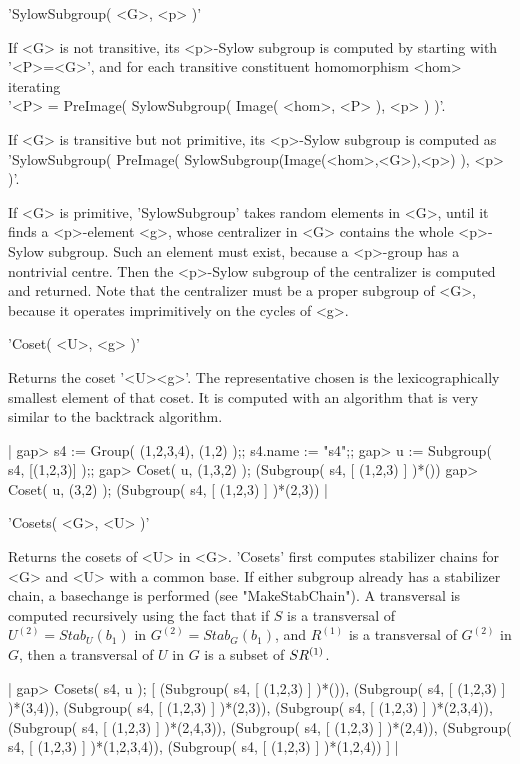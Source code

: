\vspace{5mm}
'SylowSubgroup( <G>, <p> )'%

If <G> is not transitive, its <p>-Sylow subgroup is computed by starting
with '<P>\:=<G>', and for each transitive constituent homomorphism <hom>
iterating \\
'<P> \:= PreImage( SylowSubgroup( Image( <hom>, <P> ), <p> ) )'.

If <G>  is  transitive but  not  primitive,  its  <p>-Sylow  subgroup  is
computed as \\
'SylowSubgroup( PreImage( SylowSubgroup(Image(<hom>,<G>),<p>) ), <p> )'.

If <G> is primitive,  'SylowSubgroup' takes random elements in <G>, until
it finds a <p>-element <g>, whose centralizer in <G>  contains  the whole
<p>-Sylow subgroup.   Such an element must exist, because a <p>-group has
a nontrivial  centre.  Then the  <p>-Sylow subgroup of the centralizer is
computed and  returned.   Note that  the  centralizer  must  be  a proper
subgroup of <G>, because it operates imprimitively on the cycles of <g>.

\vspace{5mm}
'Coset( <U>, <g> )'%

Returns   the  coset  '<U>\*<g>'.   The  representative  chosen   is  the
lexicographically smallest element of that coset.  It is computed with an
algorithm that is very similar to the backtrack algorithm.

|    gap> s4 := Group( (1,2,3,4), (1,2) );;  s4.name := "s4";;
    gap> u := Subgroup( s4, [(1,2,3)] );;
    gap> Coset( u, (1,3,2) );
    (Subgroup( s4, [ (1,2,3) ] )*())
    gap> Coset( u, (3,2) );
    (Subgroup( s4, [ (1,2,3) ] )*(2,3)) |

\vspace{5mm}
'Cosets( <G>, <U> )'%

Returns the  cosets  of <U> in  <G>.   'Cosets' first computes stabilizer
chains for <G> and <U> with  a common  base.  If either subgroup  already
has a stabilizer  chain, a basechange is performed (see "MakeStabChain").
A  transversal is  computed recursively using the fact that  if  $S$ is a
transversal of $U^{(2)} =  Stab_U(b_1)$ in  $G^{(2)}  = Stab_G(b_1)$, and
$R^{(1)}$ is a transversal of $G^{(2)}$ in $G$, then a transversal of $U$
in $G$ is a subset of $S \* R^{(1)}$.

|    gap> Cosets( s4, u );
    [ (Subgroup( s4, [ (1,2,3) ] )*()),
      (Subgroup( s4, [ (1,2,3) ] )*(3,4)),
      (Subgroup( s4, [ (1,2,3) ] )*(2,3)),
      (Subgroup( s4, [ (1,2,3) ] )*(2,3,4)),
      (Subgroup( s4, [ (1,2,3) ] )*(2,4,3)),
      (Subgroup( s4, [ (1,2,3) ] )*(2,4)),
      (Subgroup( s4, [ (1,2,3) ] )*(1,2,3,4)),
      (Subgroup( s4, [ (1,2,3) ] )*(1,2,4)) ] |

